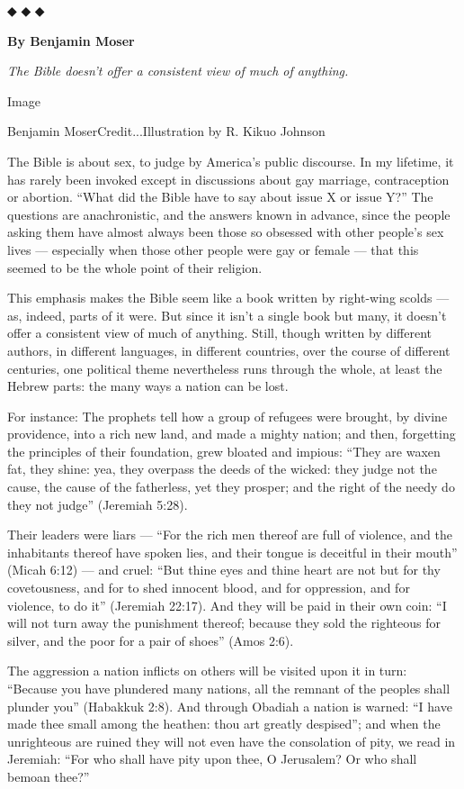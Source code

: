 ◆ ◆ ◆

\textbf{By Benjamin Moser}

\emph{The Bible doesn't offer a consistent view of much of anything.}

Image

Benjamin MoserCredit...Illustration by R. Kikuo Johnson

The Bible is about sex, to judge by America's public discourse. In my
lifetime, it has rarely been invoked except in discussions about gay
marriage, contraception or abortion. ``What did the Bible have to say
about issue X or issue Y?'' The questions are anachronistic, and the
answers known in advance, since the people asking them have almost
always been those so obsessed with other people's sex lives ---
especially when those other people were gay or female --- that this
seemed to be the whole point of their religion.

This emphasis makes the Bible seem like a book written by right-wing
scolds --- as, indeed, parts of it were. But since it isn't a single
book but many, it doesn't offer a consistent view of much of anything.
Still, though written by different authors, in different languages, in
different countries, over the course of different centuries, one
political theme nevertheless runs through the whole, at least the Hebrew
parts: the many ways a nation can be lost.

For instance: The prophets tell how a group of refugees were brought, by
divine providence, into a rich new land, and made a mighty nation; and
then, forgetting the principles of their foundation, grew bloated and
impious: ``They are waxen fat, they shine: yea, they overpass the deeds
of the wicked: they judge not the cause, the cause of the fatherless,
yet they prosper; and the right of the needy do they not judge''
(Jeremiah 5:28).

Their leaders were liars --- ``For the rich men thereof are full of
violence, and the inhabitants thereof have spoken lies, and their tongue
is deceitful in their mouth'' (Micah 6:12) --- and cruel: ``But thine
eyes and thine heart are not but for thy covetousness, and for to shed
innocent blood, and for oppression, and for violence, to do it''
(Jeremiah 22:17). And they will be paid in their own coin: ``I will not
turn away the punishment thereof; because they sold the righteous for
silver, and the poor for a pair of shoes'' (Amos 2:6).

The aggression a nation inflicts on others will be visited upon it in
turn: ``Because you have plundered many nations, all the remnant of the
peoples shall plunder you'' (Habakkuk 2:8). And through Obadiah a nation
is warned: ``I have made thee small among the heathen: thou art greatly
despised''; and when the unrighteous are ruined they will not even have
the consolation of pity, we read in Jeremiah: ``For who shall have pity
upon thee, O Jerusalem? Or who shall bemoan thee?''

